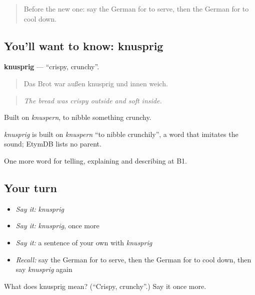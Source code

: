 \label{lesson:GE-C329-knusprig}



\begin{quote}
Before the new one: say the German for to serve, then the German for to cool down.
\end{quote}

\subsection*{You'll want to know: knusprig}
\textbf{knusprig} — \textquotedblleft{}crispy, crunchy\textquotedblright{}.

\begin{quote}
Das Brot war außen knusprig und innen weich.
\end{quote}

\begin{quote}
\emph{The bread was crispy outside and soft inside.}
\end{quote}

Built on \emph{knuspern}, to nibble something crunchy.

\begin{cousinweb}
\emph{knusprig} is built on \emph{knuspern} \textquotedblleft{}to nibble crunchily\textquotedblright{}, a word that imitates the sound; EtymDB lists no parent.
\end{cousinweb}

\begin{grammarlens}[title={What you've built}]
One more word for telling, explaining and describing at B1.
\end{grammarlens}

\subsection*{Your turn}
\begin{itemize}
\raggedright
  \item \emph{Say it:} \emph{knusprig}
  \item \emph{Say it:} \emph{knusprig}, once more
  \item \emph{Say it:} a sentence of your own with \emph{knusprig}
  \item \emph{Recall:} say the German for to serve, then the German for to cool down, then say \emph{knusprig} again
\end{itemize}

\begin{tcolorbox}[breakable,colback=teal!4,colframe=teal!35!black,title={Before you move on}]
What does knusprig mean? (\textquotedblleft{}Crispy, crunchy\textquotedblright{}.) Say it once more.
\end{tcolorbox}
